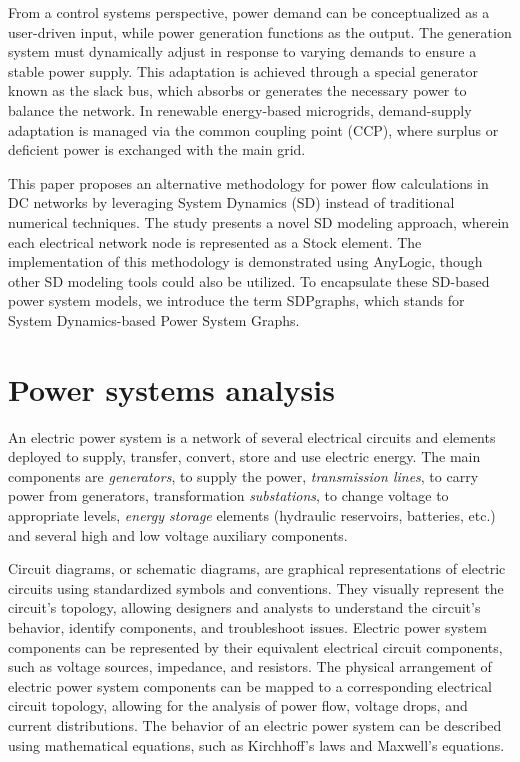 \documentclass[11pt, a4paper]{article}
\theoremstyle{definition}
\theoremstyle{plain}
\theoremstyle{plain}
\theoremstyle{remark}
\theoremstyle{remark}
\theoremstyle{remark}
\begin{document}
From a control systems perspective, power demand can be conceptualized as a user-driven input, while power generation functions as the output. The generation system must dynamically adjust in response to varying demands to ensure a stable power supply. This adaptation is achieved through a special generator known as the slack bus, which absorbs or generates the necessary power to balance the network. In renewable energy-based microgrids, demand-supply adaptation is managed via the common coupling point (CCP), where surplus or deficient power is exchanged with the main grid.

This paper proposes an alternative methodology for power flow calculations in DC networks by leveraging System Dynamics (SD) instead of traditional numerical techniques. The study presents a novel SD modeling approach, wherein each electrical network node is represented as a Stock element. The implementation of this methodology is demonstrated using AnyLogic, though other SD modeling tools could also be utilized. To encapsulate these SD-based power system models, we introduce the term SDPgraphs, which stands for System Dynamics-based Power System Graphs.


\section{Power systems analysis}

An electric power system is a network of several electrical circuits and elements deployed to supply, transfer, convert, store and use electric energy. The main components are \textit{generators}, to supply the power, \textit{transmission lines}, to carry power from generators, transformation \textit{substations}, to change voltage to appropriate levels, \textit{energy storage} elements (hydraulic reservoirs, batteries, etc.) and several high and low voltage auxiliary components.

Circuit diagrams, or schematic diagrams, are graphical representations of electric circuits using standardized symbols and conventions. They visually represent the circuit’s topology, allowing designers and analysts to understand the circuit’s behavior, identify components, and troubleshoot issues. Electric power system components can be represented by their equivalent electrical circuit components, such as voltage sources, impedance, and resistors. The physical arrangement of electric power system components can be mapped to a corresponding electrical circuit topology, allowing for the analysis of power flow, voltage drops, and current distributions. The behavior of an electric power system can be described using mathematical equations, such as Kirchhoff’s laws and Maxwell’s equations.
\end{document}
